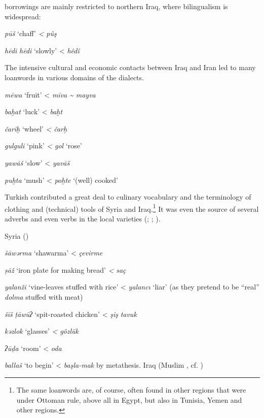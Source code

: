 \documentclass[output=paper]{langsci/langscibook}
\begin{document}
 borrowings are mainly restricted to northern Iraq, where {bilingualism} is widespread: 
\ea
{}

\textit{pūš} ‘chaff’ \textit{<}  \textit{pûş}

\textit{hēdi} \textit{hēdi} ‘slowly’ <  \textit{hêdî} \citep[68]{Jastrow1979}
\z

The {intensive} cultural and economic contacts between Iraq and Iran led to many  {loanwords} in various domains of the  dialects. 

\ea
\textit{mēwa} ‘fruit’ <  \textit{mīva} \textit{{\textasciitilde} mayva}

\textit{baḫat} ‘luck’ <  \textit{baḫt}

\textit{čariḫ} ‘wheel’ \textit{<}  \textit{čarḫ} 

\textit{gulguli} ‘pink’ \textit{<}  \textit{gol} ‘rose’

\textit{yawāš} ‘slow’ <  \textit{yavāš}

\textit{puḫta} ‘mush’ <  \textit{poḫte} ‘(well) cooked’
\z

 {Turkish} contributed a great deal to culinary vocabulary and the terminology of clothing and (technical) tools of Syria and Iraq.\footnote{The same {loanwords} are, of course, often found in other regions that were under Ottoman rule, above all in Egypt, but also in Tunisia, {Yemen} and other regions.} It was even the source of several adverbs and even verbs in the local  varieties (\citealt{Halasi-Kun1969}; \citeyear{Halasi-Kun1973}; \citeyear{Halasi-Kun1982}).

\ea
Syria ()

\textit{šāwərma} ‘shawarma’ <  \textit{çevirme} 

\textit{ṣāž} ‘iron plate for making bread’ \textit{<}  \textit{saç}

\textit{yalanži} ‘vine-leaves stuffed with rice’ <  \textit{yalancı} ‘liar’ (as they pretend to be “real” \textit{dolma} stuffed with meat)

\textit{šīš} \textit{ṭāwūʔ} ‘spit-roasted chicken’ <  \textit{şiş} \textit{tavuk}

\textit{kǝzlok} ‘glasses’ \textit{<}  \textit{gözlük}

\textit{ʔūḍa} ‘room’ <  \textit{oda}

\textit{ballaš} ‘to begin’ <  \textit{başla-mak} by metathesis.
\ex 
Iraq (Muslim , cf. \citealt{Reinkowski1995}) 
\end{document}

